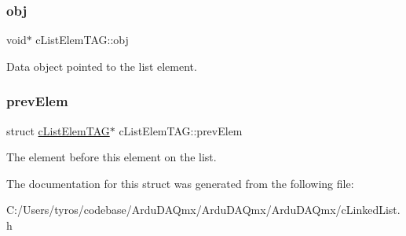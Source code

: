 \subsubsection{\texorpdfstring{obj}{obj}}
{\footnotesize\ttfamily void$\ast$ c\+List\+Elem\+T\+A\+G\+::obj}

Data object pointed to the list element. \mbox{\label{structc_list_elem_t_a_g_a563abebeaccea17de149b4baf1803bc2}} 
\subsubsection{\texorpdfstring{prev\+Elem}{prevElem}}
{\footnotesize\ttfamily struct \mbox{\hyperlink{structc_list_elem_t_a_g}{c\+List\+Elem\+T\+AG}}$\ast$ c\+List\+Elem\+T\+A\+G\+::prev\+Elem}

The element before this element on the list. 

The documentation for this struct was generated from the following file\+:\begin{DoxyCompactItemize}
\item 
C\+:/\+Users/tyros/codebase/\+Ardu\+D\+A\+Qmx/\+Ardu\+D\+A\+Qmx/\+Ardu\+D\+A\+Qmx/c\+Linked\+List.\+h\end{DoxyCompactItemize}
